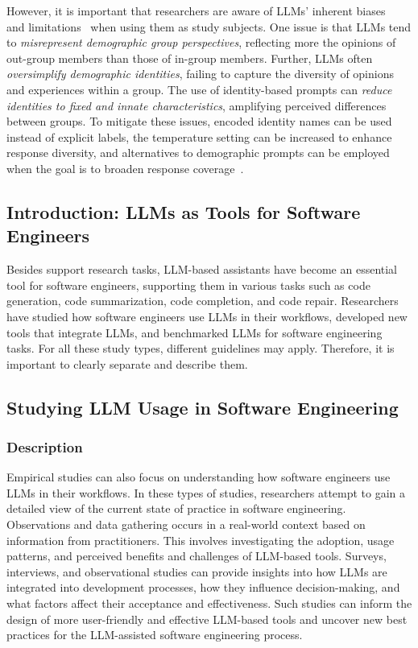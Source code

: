 However, it is important that researchers are aware of LLMs' inherent biases~\cite{Crowell2023} and limitations~\cite{DBLP:journals/ais/HardingDLL24, DBLP:journals/corr/abs-2402-01908} when using them as study subjects.
One issue is that LLMs tend to \emph{misrepresent demographic group perspectives}, reflecting more the opinions of out-group members than those of in-group members.
Further, LLMs often \emph{oversimplify demographic identities}, failing to capture the diversity of opinions and experiences within a group.
The use of identity-based prompts can \emph{reduce identities to fixed and innate characteristics}, amplifying perceived differences between groups.
To mitigate these issues, encoded identity names can be used instead of explicit labels, the temperature setting can be increased to enhance response diversity, and alternatives to demographic prompts can be employed when the goal is to broaden response coverage~\cite{DBLP:journals/ais/HardingDLL24, DBLP:journals/corr/abs-2402-01908}.


\subsection{Introduction: LLMs as Tools for Software Engineers}

Besides support research tasks, LLM-based assistants have become an essential tool for software engineers, supporting them in various tasks such as code generation, code summarization, code completion, and code repair.
Researchers have studied how software engineers use LLMs in their workflows, developed new tools that integrate LLMs, and benchmarked LLMs for software engineering tasks.
For all these study types, different guidelines may apply.
Therefore, it is important to clearly separate and describe them. 

\subsection{Studying LLM Usage in Software Engineering}

\subsubsection{Description}

Empirical studies can also focus on understanding how software engineers use LLMs in their workflows.
In these types of studies, researchers attempt to gain a detailed view of the current state of practice in software engineering.
Observations and data gathering occurs in a real-world context based on information from practitioners.
This involves investigating the adoption, usage patterns, and perceived benefits and challenges of LLM-based tools. 
Surveys, interviews, and observational studies can provide insights into how LLMs are integrated into development processes, how they influence decision-making, and what factors affect their acceptance and effectiveness. 
Such studies can inform the design of more user-friendly and effective LLM-based tools and uncover new best practices for the LLM-assisted software engineering process.

